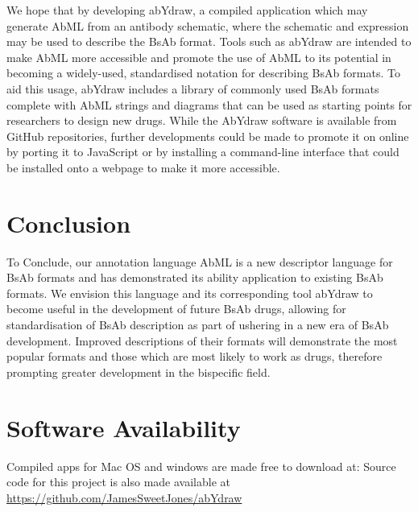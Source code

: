 \documentclass{article}
\begin{document}
We hope that by developing abYdraw, a compiled application which may
generate AbML from an antibody schematic, where the schematic and
expression may be used to describe the BsAb format. Tools such as
abYdraw are intended to make AbML more accessible and promote the use
of AbML to its potential in becoming a widely-used, standardised
notation for describing BsAb formats. To aid this usage, abYdraw
includes a library of commonly used BsAb formats complete with AbML
strings and diagrams that can be used as starting points for
researchers to design new drugs. While the AbYdraw software is
available from GitHub repositories, further developments could be made
to promote it on online by porting it to JavaScript or by installing a
command-line interface that could be installed onto a webpage to make
it more accessible.  


\section{Conclusion}

To Conclude, our annotation language AbML is a new descriptor language
for BsAb formats and has demonstrated its ability application to
existing BsAb formats. We envision this language and its corresponding
tool abYdraw to become useful in the development of future BsAb drugs,
allowing for standardisation of BsAb description as part of ushering
in a new era of BsAb development. Improved descriptions of their
formats will demonstrate the most popular formats and those which are
most likely to work as drugs, therefore prompting greater development
in the bispecific field.  

\section{Software Availability}
Compiled apps for Mac OS and windows are made free to download at:
Source code for this project is also made available at
\url{https://github.com/JamesSweetJones/abYdraw}

 
\end{document}

